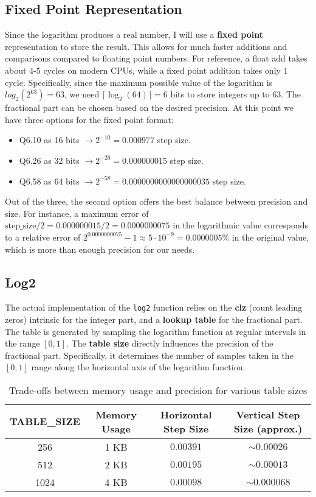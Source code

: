 \documentclass[11pt]{article}
\begin{document}
\subsection{Fixed Point Representation}
Since the logarithm produces a real number, I will use a \textbf{fixed point} representation to store the result. This allows for much faster additions and comparisons compared to floating point numbers. For reference, a float add takes about 4-5 cycles on modern CPUs\textsuperscript{\cite{agner2024}}, while a fixed point addition takes only 1 cycle. Specifically, since the maximum possible value of the logarithm is $log_2(2^{63}) = 63$, we need $\lceil \log_2(64) \rceil = 6$ bits to store integers up to 63. The fractional part can be chosen based on the desired precision. At this point we have three options for the fixed point format:
\begin{itemize}
    \item Q6.10 as 16 bits $\rightarrow 2^{-10} = 0.000977$ step size.
    \item Q6.26 as 32 bits $\rightarrow 2^{-26} = 0.000000015$ step size.
    \item Q6.58 as 64 bits $\rightarrow 2^{-58} = 0.0000000000000000035$ step size.
\end{itemize}
Out of the three, the second option offers the best balance between precision and size. For instance, a maximum error of $\text{step\_size} / 2 = 0.000000015 / 2 = 0.0000000075$ in the logarithmic value corresponds to a relative error of $2^{0.0000000075} - 1 \approx 5 \cdot 10^{-9} = 0.0000005\%$ in the original value, which is more than enough precision for our needs.

\subsection{Log2}
The actual implementation of the \texttt{log2} function relies on the \textbf{clz} (count leading zeros) intrinsic for the integer part, and a \textbf{lookup table} for the fractional part. The table is generated by sampling the logarithm function at regular intervals in the range $[0, 1]$.
The \textbf{table size} directly influences the precision of the fractional part. Specifically, it determines the number of samples taken in the $[0, 1]$ range along the horizontal axis of the logarithm function.
\begin{table}[h]
\centering
\begin{tabular}{|c|c|c|c|}
\hline
\textbf{TABLE\_SIZE} & \textbf{Memory Usage} & \textbf{Horizontal Step Size} & \textbf{Vertical Step Size (approx.)} \\
\hline
256     & 1 KB    & $0.00391$   & $\sim0.00026$ \\
512     & 2 KB    & $0.00195$   & $\sim0.00013$ \\
1024    & 4 KB    & $0.00098$   & $\sim0.000068$ \\
\hline
\end{tabular}
\caption{Trade-offs between memory usage and precision for various table sizes}
\end{table}
\end{document}
